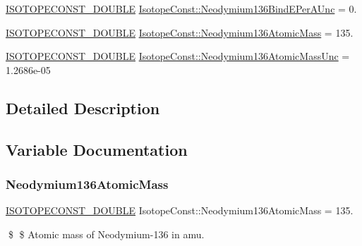 \begin{DoxyCompactItemize}
\mbox{\hyperlink{group___isotope_const-_macros_ga8f45a7272ce02c0b4c65c44636ed719a}{I\+S\+O\+T\+O\+P\+E\+C\+O\+N\+S\+T\+\_\+\+D\+O\+U\+B\+LE}} \mbox{\hyperlink{group___isotope_const-_neodymium-_nd136_gab4272ee33f865346ee8e09addb4345bf}{Isotope\+Const\+::\+Neodymium136\+Bind\+E\+Per\+A\+Unc}} = 0.
\item 
\mbox{\hyperlink{group___isotope_const-_macros_ga8f45a7272ce02c0b4c65c44636ed719a}{I\+S\+O\+T\+O\+P\+E\+C\+O\+N\+S\+T\+\_\+\+D\+O\+U\+B\+LE}} \mbox{\hyperlink{group___isotope_const-_neodymium-_nd136_gaa350988898dfb97cbf102e50beabbc8d}{Isotope\+Const\+::\+Neodymium136\+Atomic\+Mass}} = 135.
\item 
\mbox{\hyperlink{group___isotope_const-_macros_ga8f45a7272ce02c0b4c65c44636ed719a}{I\+S\+O\+T\+O\+P\+E\+C\+O\+N\+S\+T\+\_\+\+D\+O\+U\+B\+LE}} \mbox{\hyperlink{group___isotope_const-_neodymium-_nd136_gabbbd5ae3516f11fa13abbf4ce8ec8a38}{Isotope\+Const\+::\+Neodymium136\+Atomic\+Mass\+Unc}} = 1.\+2686e-\/05
\end{DoxyCompactItemize}


\subsection{Detailed Description}


\subsection{Variable Documentation}
\mbox{\label{group___isotope_const-_neodymium-_nd136_gaa350988898dfb97cbf102e50beabbc8d}} 
\subsubsection{\texorpdfstring{Neodymium136\+Atomic\+Mass}{Neodymium136AtomicMass}}
{\footnotesize\ttfamily \mbox{\hyperlink{group___isotope_const-_macros_ga8f45a7272ce02c0b4c65c44636ed719a}{I\+S\+O\+T\+O\+P\+E\+C\+O\+N\+S\+T\+\_\+\+D\+O\+U\+B\+LE}} Isotope\+Const\+::\+Neodymium136\+Atomic\+Mass = 135.}

\$ \$ Atomic mass of Neodymium-\/136 in amu. \mbox{\label{group___isotope_const-_neodymium-_nd136_gabbbd5ae3516f11fa13abbf4ce8ec8a38}} 
